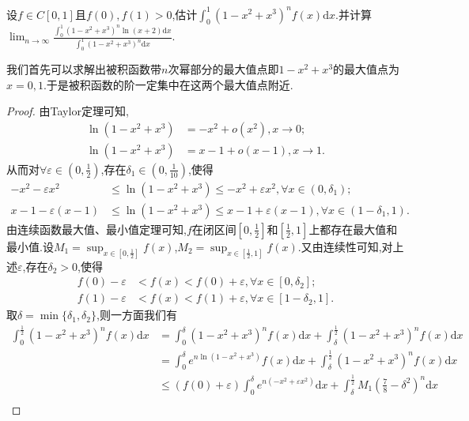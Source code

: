 \documentclass[../../main.tex]{subfiles}%
\begin{document}
\begin{example}\label{Laplace方法例题4}
设\(f\in C[0,1]\)且$f(0),f(1)>0$,估计$\int_0^1{(1 - x^2 + x^3)^nf(x)\mathrm{d}x}$.并计算$\lim_{n\rightarrow \infty} \frac{\int_0^1{\left( 1-x^2+x^3 \right) ^n\ln \left( x+2 \right) \mathrm{d}x}}{\int_0^1{\left( 1-x^2+x^3 \right) ^n\mathrm{d}x}}.$
\end{example}
\begin{note}
我们首先可以求解出被积函数带$n$次幂部分的最大值点即$1-x^2+x^3$的最大值点为$x=0,1$.于是被积函数的阶一定集中在这两个最大值点附近.
\end{note}
\begin{proof}
由Taylor定理可知,
\begin{align*}
\ln(1 - x^2 + x^3) &= -x^2 + o(x^2),  x\rightarrow 0;\\
\ln(1 - x^2 + x^3) &= x - 1 + o(x - 1),  x\rightarrow 1.
\end{align*}
从而对\(\forall \varepsilon \in (0,\frac{1}{2})\),存在\(\delta_1 \in (0,\frac{1}{10})\),使得
\begin{align*}
-x^2 - \varepsilon x^2&\leqslant\ln(1 - x^2 + x^3)\leqslant -x^2 + \varepsilon x^2, \forall x\in (0,\delta_1);\\
x - 1 - \varepsilon(x - 1)&\leqslant\ln(1 - x^2 + x^3)\leqslant x - 1 + \varepsilon(x - 1), \forall x\in (1 - \delta_1,1).
\end{align*}
由连续函数最大值、最小值定理可知,\(f\)在闭区间\([0,\frac{1}{2}]\)和$[\frac{1}{2},1]$上都存在最大值和最小值.设\(M_1 = \sup_{x\in [0,\frac{1}{2}]}f(x)\),\(M_2 = \sup_{x\in [\frac{1}{2},1]}f(x)\).又由连续性可知,对上述\(\varepsilon\),存在\(\delta_2>0\),使得
\begin{align*}
f(0) - \varepsilon&< f(x) < f(0) + \varepsilon, \forall x\in [0,\delta_2];\\
f(1) - \varepsilon&< f(x) < f(1) + \varepsilon, \forall x\in [1 - \delta_2,1].
\end{align*}
取\(\delta = \min\{\delta_1,\delta_2\}\),则一方面我们有
\begin{align*}
\int_0^{\frac{1}{2}}{(1 - x^2 + x^3)^nf(x)\mathrm{d}x}&=\int_0^{\delta}{(1 - x^2 + x^3)^nf(x)\mathrm{d}x}+\int_{\delta}^{\frac{1}{2}}{(1 - x^2 + x^3)^nf(x)\mathrm{d}x}\\
&=\int_0^{\delta}{e^{n\ln(1 - x^2 + x^3)}f(x)\mathrm{d}x}+\int_{\delta}^{\frac{1}{2}}{(1 - x^2 + x^3)^nf(x)\mathrm{d}x}\\
&\leqslant (f(0) + \varepsilon)\int_0^{\delta}{e^{n(-x^2 + \varepsilon x^2)}\mathrm{d}x}+\int_{\delta}^{\frac{1}{2}}{M_1\left(\frac{7}{8}-\delta^2\right)^n\mathrm{d}x}\\

\end{align*}
\end{proof}
\end{document}
